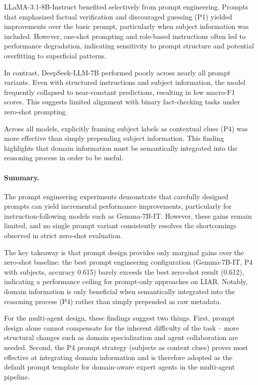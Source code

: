 LLaMA-3.1-8B-Instruct benefited selectively from prompt engineering. Prompts that emphasized factual verification and discouraged guessing (P1) yielded improvements over the basic prompt, particularly when subject information was included. However, one-shot prompting and role-based instructions often led to performance degradation, indicating sensitivity to prompt structure and potential overfitting to superficial patterns.

In contrast, DeepSeek-LLM-7B performed poorly across nearly all prompt variants. Even with structured instructions and subject information, the model frequently collapsed to near-constant predictions, resulting in low macro-F1 scores. This suggests limited alignment with binary fact-checking tasks under zero-shot prompting.

Across all models, explicitly framing subject labels as contextual clues (P4) was more effective than simply prepending subject information. This finding highlights that domain information must be semantically integrated into the reasoning process in order to be useful.

\paragraph{Summary.}
The prompt engineering experiments demonstrate that carefully designed prompts can yield incremental performance improvements, particularly for instruction-following models such as Gemma-7B-IT. However, these gains remain limited, and no single prompt variant consistently resolves the shortcomings observed in strict zero-shot evaluation.

The key takeaway is that prompt design provides only marginal gains over the zero-shot baseline: the best prompt engineering configuration (Gemma-7B-IT, P4 with subjects, accuracy 0.615) barely exceeds the best zero-shot result (0.612), indicating a performance ceiling for prompt-only approaches on LIAR. Notably, domain information is only beneficial when semantically integrated into the reasoning process (P4) rather than simply prepended as raw metadata.

For the multi-agent design, these findings suggest two things. First, prompt design alone cannot compensate for the inherent difficulty of the task -- more structural changes such as domain specialization and agent collaboration are needed. Second, the P4 prompt strategy (subjects as context clues) proves most effective at integrating domain information and is therefore adopted as the default prompt template for domain-aware expert agents in the multi-agent pipeline.


